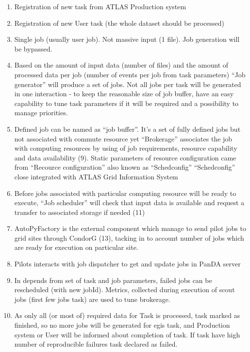\begin{enumerate}
	\item Registration of new task from ATLAS Production system
    \item Registration of new User task (the whole dataset should be
    processed)
    \item Single job (usually user job). Not massive input (1 file). Job
    generation will be bypassed.
    \item Based on the amount of input data (number of files) and the amount
    of processed data per job (number of events per job from task parameters)
    ``Job generator''  will produce a set of jobs. Not all jobs per task will
    be generated in one interaction - to keep the reasonable size of job
    buffer, have an easy capability to tune task parameters if it will be
    required and a possibility to manage priorities.
    \item Defined job can be named as ``job buffer''. It’s a set of fully
    defined jobs but not associated with commute resource yet ``Brokerage''
    associates the job with computing resources by using of job requirements,
    resource capability and data availability (9). Static parameters of
    resource configuration came from ``Recource configuration'' also known as
    ``Schedconfig'' ``Schedconfig''  close integrated with ATLAS Grid
    Information System
	\item Before jobs associated with particular computing resource will be
	ready to execute, ``Job scheduler'' will check that input data is
	available and request a transfer to associated storage if needed (11)
	\item AutoPyFactory is the external component which manage to send pilot
	jobs to grid sites through CondorG (13), tacking in to account number of
	jobs which are ready for execution on particular site.
	\item Pilots interacts with job dispatcher to get and update jobs in
	PanDA server
	\item In depends from set of task and job parameters, failed jobs can be
	rescheduled (with new jobId). Metrics, collected during execution of
	scout jobs (first few jobs task) are used to tune brokerage.
	\item As only all (or most of) required data for Task is processed, task
	marked as finished, so no more jobs will be generated for egis task, and
	Production system or User will be informed about completion of task. If
	task have high number of reproducible failures task declared as failed.
\end{enumerate}

